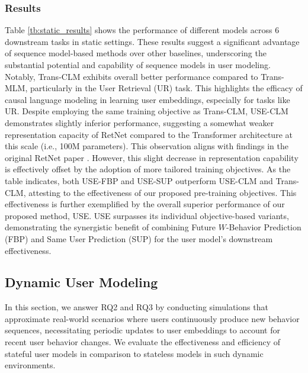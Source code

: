 \documentclass{article}
\begin{document}
\subsubsection{Results}



Table \ref{tb:static_results} shows the performance of different models across $6$ downstream tasks in static settings. These results suggest a significant advantage of sequence model-based methods over other baselines, underscoring the substantial potential and capability of sequence models in user modeling. Notably, Trans-CLM exhibits overall better performance compared to Trans-MLM, particularly in the User Retrieval (UR) task. This highlights the efficacy of causal language modeling in learning user embeddings, especially for tasks like UR. Despite employing the same training objective as Trans-CLM, USE-CLM demonstrates slightly inferior performance, suggesting a somewhat weaker representation capacity of RetNet compared to the Transformer architecture at this scale (i.e., 100M parameters). This observation aligns with findings in the original RetNet paper \citep{retnet}.
However, this slight decrease in representation capability is effectively offset by the adoption of more tailored training objectives. As the table indicates, both USE-FBP and USE-SUP outperform USE-CLM and Trans-CLM, attesting to the effectiveness of our proposed pre-training objectives. This effectiveness is further exemplified by the overall superior performance of our proposed method, USE. USE surpasses its individual objective-based variants, demonstrating the synergistic benefit of combining Future $W$-Behavior Prediction (FBP) and Same User Prediction (SUP) for the user model's downstream effectiveness.

\subsection{Dynamic User Modeling}
\label{subsec:experiments_dynamic}

In this section, we answer RQ2 and RQ3 by conducting simulations that approximate real-world scenarios where users continuously produce new behavior sequences, necessitating periodic updates to user embeddings to account for recent user behavior changes. We evaluate the effectiveness and efficiency of stateful user models in comparison to stateless models in such dynamic environments.

\end{document}
